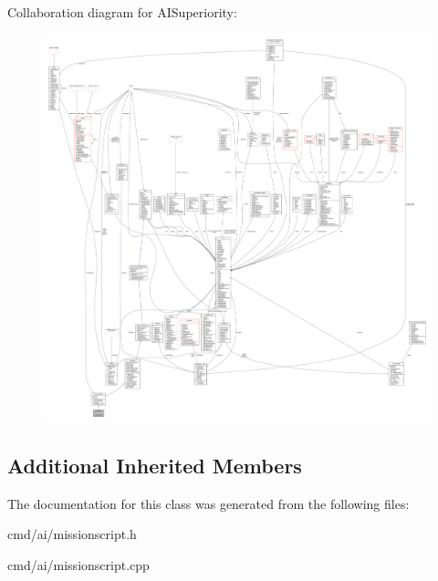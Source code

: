 Collaboration diagram for A\+I\+Superiority\+:
\nopagebreak
\begin{figure}[H]
\begin{center}
\leavevmode
\includegraphics[width=350pt]{dc/dd9/classAISuperiority__coll__graph}
\end{center}
\end{figure}
\subsection*{Additional Inherited Members}


The documentation for this class was generated from the following files\+:\begin{DoxyCompactItemize}
\item 
cmd/ai/missionscript.\+h\item 
cmd/ai/missionscript.\+cpp\end{DoxyCompactItemize}
